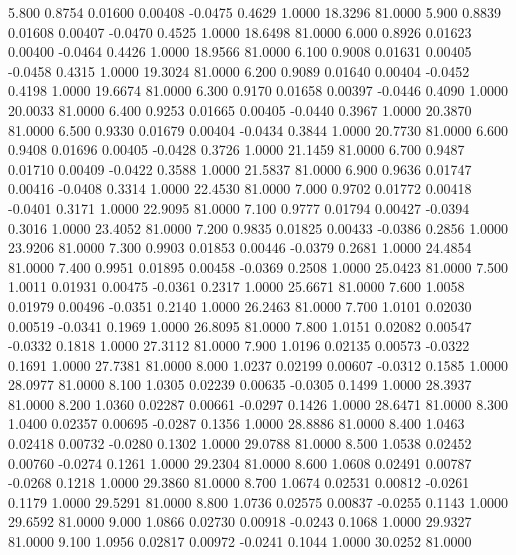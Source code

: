    5.800   0.8754   0.01600   0.00408  -0.0475   0.4629   1.0000  18.3296  81.0000
   5.900   0.8839   0.01608   0.00407  -0.0470   0.4525   1.0000  18.6498  81.0000
   6.000   0.8926   0.01623   0.00400  -0.0464   0.4426   1.0000  18.9566  81.0000
   6.100   0.9008   0.01631   0.00405  -0.0458   0.4315   1.0000  19.3024  81.0000
   6.200   0.9089   0.01640   0.00404  -0.0452   0.4198   1.0000  19.6674  81.0000
   6.300   0.9170   0.01658   0.00397  -0.0446   0.4090   1.0000  20.0033  81.0000
   6.400   0.9253   0.01665   0.00405  -0.0440   0.3967   1.0000  20.3870  81.0000
   6.500   0.9330   0.01679   0.00404  -0.0434   0.3844   1.0000  20.7730  81.0000
   6.600   0.9408   0.01696   0.00405  -0.0428   0.3726   1.0000  21.1459  81.0000
   6.700   0.9487   0.01710   0.00409  -0.0422   0.3588   1.0000  21.5837  81.0000
   6.900   0.9636   0.01747   0.00416  -0.0408   0.3314   1.0000  22.4530  81.0000
   7.000   0.9702   0.01772   0.00418  -0.0401   0.3171   1.0000  22.9095  81.0000
   7.100   0.9777   0.01794   0.00427  -0.0394   0.3016   1.0000  23.4052  81.0000
   7.200   0.9835   0.01825   0.00433  -0.0386   0.2856   1.0000  23.9206  81.0000
   7.300   0.9903   0.01853   0.00446  -0.0379   0.2681   1.0000  24.4854  81.0000
   7.400   0.9951   0.01895   0.00458  -0.0369   0.2508   1.0000  25.0423  81.0000
   7.500   1.0011   0.01931   0.00475  -0.0361   0.2317   1.0000  25.6671  81.0000
   7.600   1.0058   0.01979   0.00496  -0.0351   0.2140   1.0000  26.2463  81.0000
   7.700   1.0101   0.02030   0.00519  -0.0341   0.1969   1.0000  26.8095  81.0000
   7.800   1.0151   0.02082   0.00547  -0.0332   0.1818   1.0000  27.3112  81.0000
   7.900   1.0196   0.02135   0.00573  -0.0322   0.1691   1.0000  27.7381  81.0000
   8.000   1.0237   0.02199   0.00607  -0.0312   0.1585   1.0000  28.0977  81.0000
   8.100   1.0305   0.02239   0.00635  -0.0305   0.1499   1.0000  28.3937  81.0000
   8.200   1.0360   0.02287   0.00661  -0.0297   0.1426   1.0000  28.6471  81.0000
   8.300   1.0400   0.02357   0.00695  -0.0287   0.1356   1.0000  28.8886  81.0000
   8.400   1.0463   0.02418   0.00732  -0.0280   0.1302   1.0000  29.0788  81.0000
   8.500   1.0538   0.02452   0.00760  -0.0274   0.1261   1.0000  29.2304  81.0000
   8.600   1.0608   0.02491   0.00787  -0.0268   0.1218   1.0000  29.3860  81.0000
   8.700   1.0674   0.02531   0.00812  -0.0261   0.1179   1.0000  29.5291  81.0000
   8.800   1.0736   0.02575   0.00837  -0.0255   0.1143   1.0000  29.6592  81.0000
   9.000   1.0866   0.02730   0.00918  -0.0243   0.1068   1.0000  29.9327  81.0000
   9.100   1.0956   0.02817   0.00972  -0.0241   0.1044   1.0000  30.0252  81.0000
